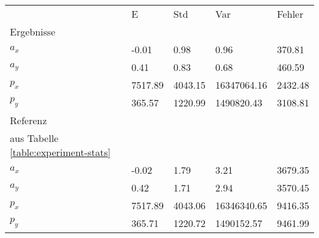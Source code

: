 \begin{tabular}{l|l|l|l|l}

     & E   & Std    & Var    & Fehler \\
\hhline{=|=|=|=|=}

Ergebnisse & & & & \\
$a_x$  &        -0.01 &         0.98 &         0.96 &       370.81 \\
$a_y$  &         0.41 &         0.83 &         0.68 &       460.59 \\
$p_x$  &      7517.89 &      4043.15 &  16347064.16 &      2432.48 \\
$p_y$  &       365.57 &      1220.99 &   1490820.43 &      3108.81 \\

\hline
Referenz & & & & \\
aus Tabelle  \ref{table:experiment-stats} & & & & \\
$a_x$  &        -0.02 &         1.79 &         3.21 &      3679.35 \\
$a_y$  &         0.42 &         1.71 &         2.94 &      3570.45 \\
$p_x$  &      7517.89 &      4043.06 &  16346340.65 &      9416.35 \\
$p_y$  &       365.71 &      1220.72 &   1490152.57 &      9461.99 \\
\end{tabular}
